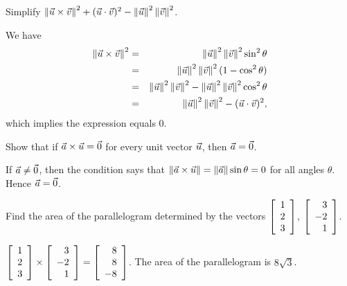 \documentclass{ximera}
\begin{document}
  \begin{example}
    Simplify
    $\norm{\vect{u}\times \vect{v}}^2+(\vect{u}\cdot
      \vect{v})^2-\norm{\vect{u}}^2\norm{\vect{v}}^2$.
    \begin{solution}
      We have
      \begin{eqnarray*}
        \norm{\vect{u}\times \vect{v}}^2
        &=&\norm{\vect{u}
            }^2\norm{\vect{v}}^2\sin^2\theta \\
        &=&\norm{\vect{u}}^2\norm{\vect{v}}^2(1-\cos^2\theta) \\
        &=&\norm{\vect{u}}^2\norm{\vect{v}}^2
            -\norm{\vect{u}}^2\norm{\vect{v}}^2\cos^2\theta \\
        &=&\norm{\vect{u}}^2\norm{\vect{v}}^2
            -(\vect{u}\cdot \vect{v})^2,
      \end{eqnarray*}
      which implies the expression equals $0$.
    \end{solution}
  \end{example}

  \begin{example}
    Show that if $\vect{a}\times \vect{u}=\vect{0}$ for every unit
    vector $\vect{u}$, then $\vect{a}=\vect{0}$.
    \begin{solution}
      If $\vect{a}\neq \vect{0}$, then the condition says that
      $\norm{\vect{a}\times \vect{u}} = \norm{\vect{a}} \sin \theta =0$
      for all angles $\theta$. Hence $\vect{a} = \vect{0}$.
    \end{solution}
  \end{example}
  
  \begin{example}
    Find the area of the parallelogram determined by the vectors
    $\startmat{r}
      1 \\
      2 \\
      3
    \stopmat$, $\startmat{r}
      3 \\
      -2 \\
      1
    \stopmat$.
    \begin{solution}
      $\startmat{r}
        1 \\
        2 \\
        3
      \stopmat \times
      \startmat{r}
        3 \\
        -2 \\
        1
      \stopmat = \startmat{r}
        8 \\
        8 \\
        -8
      \stopmat$. The area of the parallelogram is $8\sqrt{3}$.
    \end{solution}
  \end{example}
  
\end{document}
